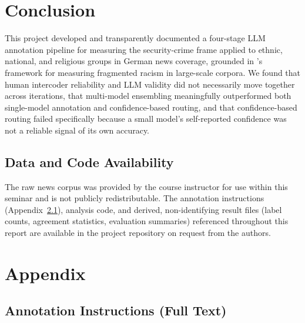 \documentclass[a4paper,oneside,bibliography=totoc]{scrartcl}
\begin{document}
\section{Conclusion}
\label{sec:conclusion}

This project developed and transparently documented a four-stage LLM annotation pipeline for measuring the security-crime frame applied to ethnic, national, and religious groups in German news coverage, grounded in \citeauthor{freudenthaler2025}'s framework for measuring fragmented racism in large-scale corpora. We found that human intercoder reliability and LLM validity did not necessarily move together across iterations, that multi-model ensembling meaningfully outperformed both single-model annotation and confidence-based routing, and that confidence-based routing failed specifically because a small model's self-reported confidence was not a reliable signal of its own accuracy. %

\subsection*{Data and Code Availability}
The raw news corpus was provided by the course instructor for use within this seminar and is not publicly redistributable. The annotation instructions (Appendix~\ref{app:instructions}), analysis code, and derived, non-identifying result files (label counts, agreement statistics, evaluation summaries) referenced throughout this report are available in the project repository on request from the authors.

\newpage


\newpage
\appendix

\section{Appendix}

\subsection{Annotation Instructions (Full Text)}
\label{app:instructions}
\end{document}

